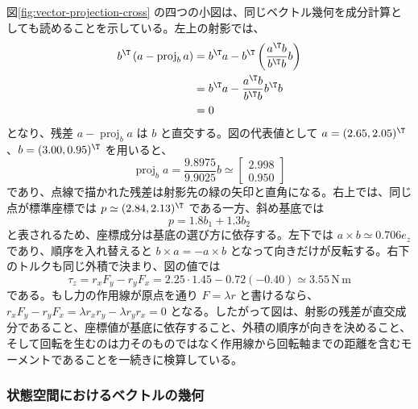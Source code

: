 図\ref{fig:vector-projection-cross} の四つの小図は、同じベクトル幾何を成分計算としても読めることを示している。左上の射影では、
\begin{align}
  b^\T\left(a-\operatorname{proj}_b a\right)
  &=
  b^\T a
  -
  b^\T\left(\frac{a^\T b}{b^\T b}b\right)\\
  &=
  b^\T a
  -
  \frac{a^\T b}{b^\T b}b^\T b\\
  &=0
\end{align}
となり、残差 $a-\operatorname{proj}_b a$ は $b$ と直交する。図の代表値として
$a=(2.65,2.05)^\T$、$b=(3.00,0.95)^\T$ を用いると、
\begin{equation}
  \operatorname{proj}_b a
  =
  \frac{9.8975}{9.9025}b
  \simeq
  \begin{bmatrix}2.998\\0.950\end{bmatrix}
\end{equation}
であり、点線で描かれた残差は射影先の緑の矢印と直角になる。右上では、同じ点が標準座標では
$p\simeq(2.84,2.13)^\T$ である一方、斜め基底では
\begin{equation}
  p=1.8b_1+1.3b_2
\end{equation}
と表されるため、座標成分は基底の選び方に依存する。左下では
$a\times b\simeq0.706e_z$ であり、順序を入れ替えると
$b\times a=-a\times b$ となって向きだけが反転する。右下のトルクも同じ外積で決まり、図の値では
\begin{equation}
  \tau_z=r_xF_y-r_yF_x
  =
  2.25\cdot1.45-0.72(-0.40)
  \simeq3.55\,\mathrm{N\,m}
\end{equation}
である。もし力の作用線が原点を通り $F=\lambda r$ と書けるなら、
$r_xF_y-r_yF_x=\lambda r_xr_y-\lambda r_yr_x=0$ となる。したがって図は、射影の残差が直交成分であること、座標値が基底に依存すること、外積の順序が向きを決めること、そして回転を生むのは力そのものではなく作用線から回転軸までの距離を含むモーメントであることを一続きに検算している。

\subsubsection{状態空間におけるベクトルの幾何}

